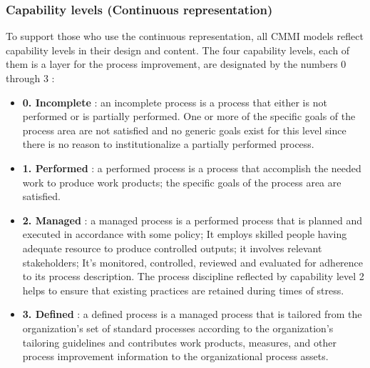 \subsubsection{Capability levels (Continuous representation)}
To support those who use the continuous representation, all CMMI models reflect capability levels in their design and content. The four capability levels, each of them is a layer for the process improvement, are designated by the numbers 0 through 3 :
\begin{itemize}
    \item \textbf{0. Incomplete} : an incomplete process is a process that either is not performed or is partially performed. One or more of the specific goals of the process area are not satisfied and no generic goals exist for this level since there is no reason to institutionalize a partially performed process.
    \item \textbf{1. Performed} : a performed process is a process that accomplish the needed work to produce work products; the specific goals of the process area are satisfied.
    \item \textbf{2. Managed} : a managed process is a performed process that is planned and executed in accordance with some policy; It employs skilled people having adequate resource to produce controlled outputs; it involves relevant stakeholders; It's monitored, controlled, reviewed and evaluated for adherence to its process description. The process discipline reflected by capability level 2 helps to ensure that existing practices are retained during times of stress.
    \item \textbf{3. Defined} : a defined process is a managed process that is tailored from the organization's set of standard processes according to the organization's tailoring guidelines and contributes work products, measures, and other process improvement information to the organizational process assets.
\end{itemize}

